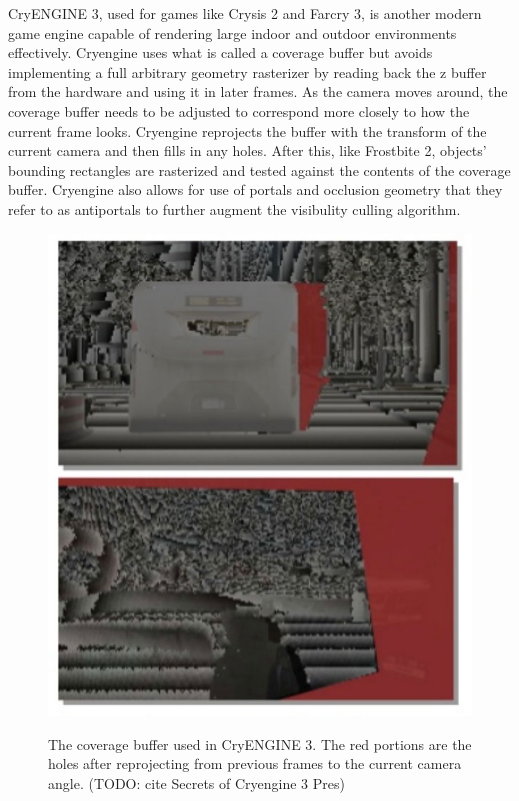 \documentclass[12pt]{ucthesis}
\newcommand{\captionfonts}{\small\bf\ssp}
\begin{document}
CryENGINE 3, used for games like Crysis 2 and Farcry 3, is another modern game engine capable of rendering large indoor and outdoor environments effectively.\cite{cryengine3, Cryengine-culling-explained}
Cryengine uses what is called a coverage buffer but avoids implementing a full arbitrary geometry rasterizer by reading back the z buffer from the hardware and using it in later frames.
As the camera moves around, the coverage buffer needs to be adjusted to correspond more closely to how the current frame looks.
Cryengine reprojects the buffer with the transform of the current camera and then fills in any holes.
After this, like Frostbite 2, objects' bounding rectangles are rasterized and tested against the contents of the coverage buffer.
Cryengine also allows for use of portals and occlusion geometry that they refer to as antiportals to further augment the visibulity culling algorithm.

\begin{figure}
\begin{center}
\includegraphics[width=\textwidth]{Images/CryCoverage.jpg}
\captionfonts
\caption[Cry Engine Coverage Buffer]{The coverage buffer used in CryENGINE 3.  The red portions are the holes after reprojecting from previous frames to the current camera angle. (TODO: cite Secrets of Cryengine 3 Pres)}
\label{fig:cry-coverage}
\end{center}
\end{figure}
\end{document}
